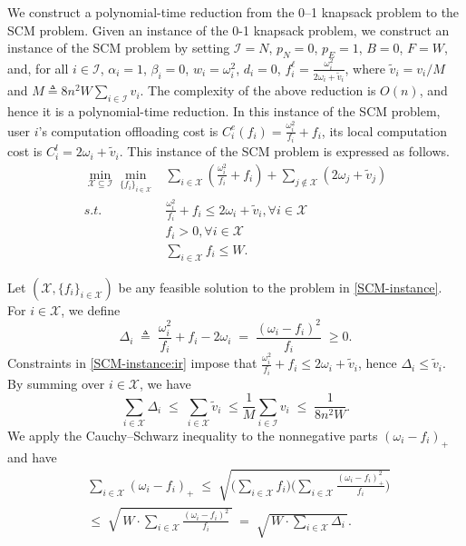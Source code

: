 \documentclass[lettersize,journal]{IEEEtran}
\begin{document}
We construct a polynomial-time reduction from the 0--1 knapsack problem to the SCM problem. Given an instance of the 0-1 knapsack problem, we construct an instance of the SCM problem by setting
$\mathcal{I}=N$, $p_N=0$, $p_E=1$, $B=0$, $F=W$, and, for all $i\in\mathcal{I}$,
$\alpha_i=1$, $\beta_i=0$, $w_i=\omega_i^2$, $d_i=0$, $f_i^\ell=\frac{\omega_i^2}{2\omega_i+\tilde{v}_i}$, where $\tilde{v}_i=v_i/M$ and $M\triangleq8n^2 W\sum_{i\in\mathcal{I}}v_i$. The complexity of the above reduction is $O(n)$, and hence it is a polynomial-time reduction.
In this instance of the SCM problem, user $i$'s computation offloading cost is $C^e_i(f_i)=\frac{\omega_i^2}{f_i}+f_i$, its local computation cost is $C^l_i=2\omega_i+\tilde{v}_i$.
This instance of the SCM problem is expressed as follows.
    \begin{subequations}\label{SCM-instance}
        \begin{align}
            \min_{\mathcal{X}\subseteq\mathcal{I}}\min_{\{f_i\}_{i\in\mathcal{X}}}&\sum_{i\in\mathcal{X}}\left(\frac{\omega_i^2}{f_i}+f_i\right)
+\sum_{j\notin\mathcal{X}}\left(2\omega_j+\tilde{v}_j\right)\\
            s.t.\ &\frac{\omega_i^2}{f_i}+f_i\le 2\omega_i+\tilde{v}_i,\forall i\in\mathcal{X}\label{SCM-instance:ir}\\
            &f_i>0,\forall i\in\mathcal{X}\\
            &\sum_{i\in\mathcal{X}}f_i\le W.
        \end{align}
    \end{subequations}

Let $(\mathcal{X},\{f_i\}_{i\in\mathcal{X}})$ be any feasible solution to the problem in \eqref{SCM-instance}. For $i\in \mathcal{X}$, we define
\[
\Delta_i\;\triangleq\;\frac{\omega_i^2}{f_i}+f_i-2\omega_i
\;=\;\frac{(\omega_i-f_i)^2}{f_i}\;\ge 0.
\]
Constraints in \eqref{SCM-instance:ir} impose that $\frac{\omega_i^2}{f_i}+f_i\le 2\omega_i+\tilde v_i$, hence $\Delta_i\le \tilde v_i$. By summing over $i\in \mathcal{X}$, we have
\begin{equation}
\sum_{i\in \mathcal{X}}\Delta_i\;\le\;\sum_{i\in \mathcal{X}}\tilde v_i\;\le\frac1M\sum_{i\in\mathcal{I}}v_i\;\le\;\frac{1}{8n^2W}.
\label{eq:sum-extra}
\end{equation}
We apply the Cauchy--Schwarz inequality to the nonnegative parts $(\omega_i-f_i)_+$ and have
\begin{align}
    &\sum_{i\in \mathcal{X}}(\omega_i-f_i)_+
\;\le\;
\sqrt{\Big(\sum_{i\in \mathcal{X}} f_i\Big)\Big(\sum_{i\in \mathcal{X}}\frac{(\omega_i-f_i)_+^2}{f_i}\Big)}
\;\nonumber\\&\le\;
\sqrt{\,W\cdot \sum_{i\in \mathcal{X}}\frac{(\omega_i-f_i)^2}{f_i}\,}
\;=\;
\sqrt{\,W\cdot \sum_{i\in \mathcal{X}}\Delta_i\,}.
\end{align}
\end{document}
